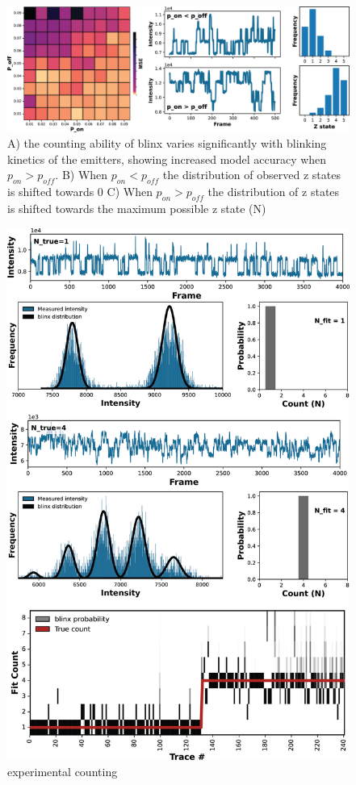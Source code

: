 \documentclass[twocolumn]{article}
\begin{document}
\begin{figure}
  \includegraphics[width=\linewidth]{figures/compare_kinetics.png}
  \caption{A) the counting ability of blinx varies significantly with blinking kinetics of the emitters, showing increased model accuracy when
   $p_{on} > p_{off}$. B) When $p_{on} < p_{off}$ the distribution of observed z states is shifted towards 0 C) When $p_{on} > p_{off}$ the 
   distribution of z states is shifted towards the maximum possible z state (N)}
  \label{fig:method:overview}
\end{figure}

\begin{figure}
  \includegraphics[width=\linewidth]{figures/experimental_counting.png}
  \caption{experimental counting}
  \label{fig:method:overview}
\end{figure}



{
  \small
  
  
}

\clearpage
% 
\end{document}
